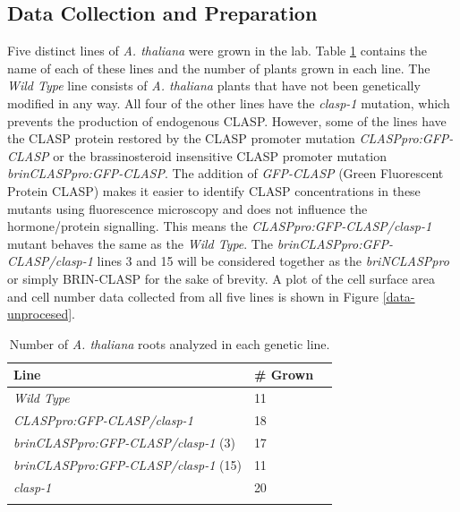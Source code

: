 \documentclass[referee,pdflatex,sn-mathphys-num]{sn-jnl}
\begin{document}
\begin{appendices}

\section{Data Collection and Preparation}\label{secA1}

Five distinct lines of \emph{A. thaliana} were grown in the lab. Table \ref{plant-lines} contains the name of each of these lines and the number of plants grown in each line. The \emph{Wild Type} line consists of \emph{A. thaliana} plants that have not been genetically modified in any way. All four of the other lines have the \emph{clasp-1} mutation, which prevents the production of endogenous CLASP. However, some of the lines have the CLASP protein restored by the CLASP promoter mutation \emph{CLASPpro:GFP-CLASP} or the brassinosteroid insensitive CLASP promoter mutation \emph{brinCLASPpro:GFP-CLASP}. The addition of \emph{GFP-CLASP} (Green Fluorescent Protein CLASP) makes it easier to identify CLASP concentrations in these mutants using fluorescence microscopy and does not influence the hormone/protein signalling. This means the \emph{CLASPpro:GFP-CLASP/clasp-1} mutant behaves the same as the \emph{Wild Type}. The \emph{brinCLASPpro:GFP-CLASP/clasp-1} lines 3 and 15 will be considered together as the \emph{briNCLASPpro} or simply BRIN-CLASP for the sake of brevity. A plot of the cell surface area and cell number data collected from all five lines is shown in Figure \ref{data-unprocesed}.

\begin{table}[!ht]
\centering
\caption{Number of \emph{A. thaliana} roots analyzed in each genetic line.}
\label{plant-lines}
\begin{tabular}{@{}lll@{}}
\toprule
Line & \# Grown \\
\midrule
\emph{Wild Type}  & 11  \\
\emph{CLASPpro:GFP-CLASP/clasp-1} & 18 \\
\emph{brinCLASPpro:GFP-CLASP/clasp-1} (3) & 17 \\
\emph{brinCLASPpro:GFP-CLASP/clasp-1} (15) & 11 \\
\emph{clasp-1} & 20 \\
\botrule
\end{tabular}
\end{table}


\end{appendices}
\end{document}
